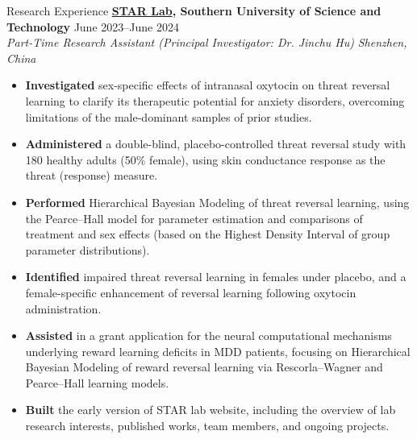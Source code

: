 \documentclass{resume} %
\begin{document}
\begin{rSection}{Research Experience}
\textbf{\href{https://star-lab.cc/startlab/STARLAB.htm}{STAR Lab}, Southern University of Science and Technology} \hfill{June 2023--June 2024} \\
\textit{Part-Time Research Assistant (Principal Investigator: Dr. Jinchu Hu)} \hfill{\textit{Shenzhen, China}}
 \begin{itemize}
    \itemsep -5pt {} 
     \item \textbf{Investigated} sex-specific effects of intranasal oxytocin on threat reversal learning to clarify its therapeutic potential for anxiety disorders, overcoming limitations of the male-dominant samples of prior studies.
     \item \textbf{Administered} a double-blind, placebo-controlled threat reversal study with 180 healthy adults (50\% female), using skin conductance response as the threat (response) measure. 
     \item \textbf{Performed} Hierarchical Bayesian Modeling of threat reversal learning, using the Pearce–Hall model for parameter estimation and comparisons of treatment and sex effects (based on the Highest Density Interval of group parameter distributions). 
     \item \textbf{Identified} impaired threat reversal learning in females under placebo, and a female-specific enhancement of reversal learning following oxytocin administration.
     \item \textbf{Assisted} in a grant application for the neural computational mechanisms underlying reward learning deficits in MDD patients, focusing on Hierarchical Bayesian Modeling of reward reversal learning via Rescorla–Wagner and Pearce–Hall learning models.
     \item \textbf{Built} the early version of STAR lab website, including the overview of lab research interests, published works, team members, and ongoing projects. 
 \end{itemize}


\end{rSection}
\end{document}
